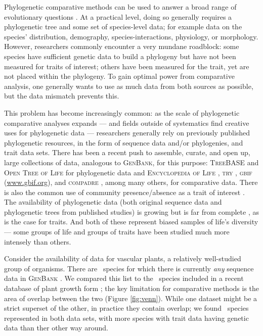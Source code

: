 \documentclass[a4paper,11pt]{article}
\begin{document}
Phylogenetic comparative methods can be used to answer a broad range of evolutionary questions \citep{omeara-2012, PennellHarmon}.  At a practical level, doing so generally requires a phylogenetic tree and some set of species-level data; for example data on the species' distribution, demography, species-interactions, physiology, or morphology. However, researchers commonly encounter a very mundane roadblock: some species have sufficient genetic data to build a phylogeny but have not been measured for traits of interest; others have been measured for the trait, yet are not placed within the phylogeny.  To gain optimal power from comparative analysis, one generally wants to use as much data from both sources as possible, but the data mismatch prevents this.

This problem has become increasingly common: as the scale of phylogenetic comparative analyses expands --- and fields outside of systematics find creative uses for phylogenetic data --- researchers generally rely on previously published phylogenetic resources, in the form of sequence data and/or phylogenies, and trait data sets. There has been a recent push to assemble, curate, and open up, large collections of data, analogous to \textsc{GenBank}, for this purpose: \textsc{TreeBASE} \citep{treebase} and \textsc{Open Tree of Life} \citep{OpenTree} for phylogenetic data and \textsc{Encyclopedia of Life} \citep{eol}, \textsc{try} \citep{try}, \textsc{gbif} (\url{www.gbif.org}), and \textsc{compadre} \citep{salguero2015}, among many others, for comparative data.  There is also the common use of community presence/absence as a trait of interest \citep{vellend2011measuring}.  The availability of phylogenetic data (both original sequence data and phylogenetic trees from published studies) is growing but is far from complete \citep{hinchliff2014}, as is the case for traits. And both of these represent biased samples of life's diversity --- some groups of life and groups of traits have been studied much more intensely than others.

Consider the availability of data for vascular plants, a relatively well-studied group of organisms. There are \ngenbank\ species for which there is currently \emph{any} sequence data in \textsc{GenBank} \citep[As of May 2015 --- accessed using the \textsc{ncbi taxonomy browser};][\url{http://www.ncbi.nlm.nih.gov/Taxonomy/Browser/wwwtax.cgi}]{ncbi-taxonomy}. We compared this list to the \nwoody\ species included in a recent database of plant growth form \citep{Zanne}; the key limitation for comparative methods is the area of overlap between the two (Figure \ref{fig:venn}).  While one dataset might be a strict superset of the other, in practice they contain overlap; we found \noverlap\ species represented in both data sets, with more species with trait data having genetic data than ther other way around.
\end{document}

